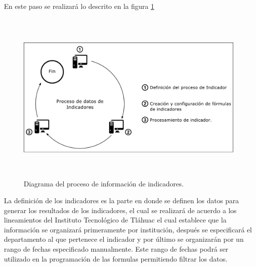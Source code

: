 				En este paso se realizar\'a lo descrito  en la figura \ref{fig_ProcesoIndicador}

				\begin{figure}[H]
			        \centering
			        \includegraphics[width=16cm, height=8.5cm]{figuras/ProcesoIndicadores}
			        \caption{Diagrama del proceso de informaci\'on de indicadores.}
			        \label{fig_ProcesoIndicador}
			    \end{figure}

			    La definici\'on de los indicadores es la parte en donde se definen los datos para generar los resultados de los indicadores, el cual se realizar\'a de acuerdo a los lineamientos del Instituto Tecnol\'ogico de Tl\'ahuac el cual establece que la informaci\'on se organizar\'a primeramente por instituci\'on, despu\'es se especificar\'a el departamento al que pertenece el indicador y por \'ultimo se organizar\'an por un rango de fechas especificado manualmente. Este rango de fechas podr\'a ser utilizado en la programaci\'on de las formulas permitiendo filtrar los datos.

